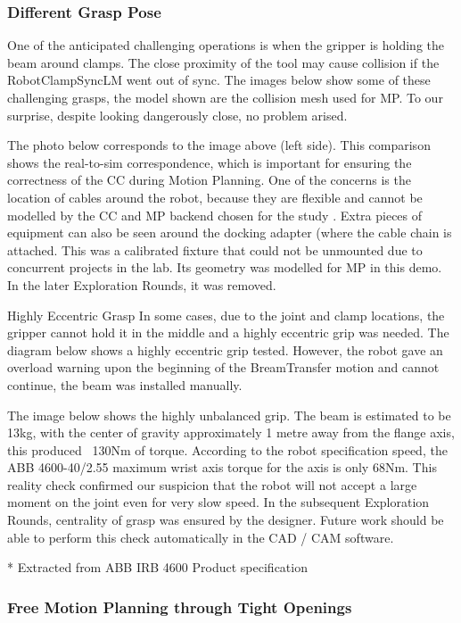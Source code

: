 \subsubsection{Different Grasp Pose}
\label{subsubsection:exploration-2-different-grasp-pose}

One of the anticipated challenging operations is when the gripper is holding the beam around clamps. The close proximity of the tool may cause collision if the RobotClampSyncLM went out of sync. The images below show some of these challenging grasps, the model shown are the collision mesh used for MP. To our surprise, despite looking dangerously close, no problem arised.

The photo below corresponds to the image above (left side). This comparison shows the real-to-sim correspondence, which is important for ensuring the correctness of the CC during Motion Planning. One of the concerns is the location of cables around the robot, because they are flexible and cannot be modelled by the CC and MP backend chosen for the study .
Extra pieces of equipment can also be seen around the docking adapter (where the cable chain is attached. This was a calibrated fixture that could not be unmounted due to concurrent projects in the lab. Its geometry was modelled for MP in this demo. In the later Exploration Rounds, it was removed.


Highly Eccentric Grasp 
In some cases, due to the joint and clamp locations, the gripper cannot hold it in the middle and a highly eccentric grip was needed. The diagram below shows a highly eccentric grip tested. However, the robot gave an overload warning upon the beginning of the BreamTransfer motion and cannot continue, the beam was installed manually. 

The image below shows the highly unbalanced grip. The beam is estimated to be 13kg, with the center of gravity approximately 1 metre away from the flange axis, this produced ~130Nm of torque. According to the robot specification speed, the ABB 4600-40/2.55 maximum wrist axis torque for the axis is only 68Nm. This reality check confirmed our suspicion that the robot will not accept a large moment on the joint even for very slow speed. In the subsequent Exploration Rounds, centrality of grasp was ensured by the designer. Future work should be able to perform this check automatically in the CAD / CAM software.


* Extracted from ABB IRB 4600 Product specification 
\subsubsection{Free Motion Planning through Tight Openings}
\label{subsubsection:exploration-2-free-motion-planning-through-tight-openings}

